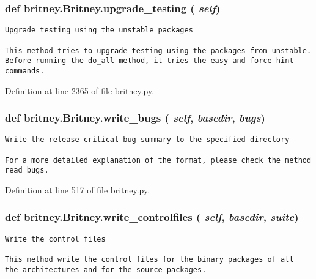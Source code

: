 \subsubsection{\setlength{\rightskip}{0pt plus 5cm}def britney.Britney.upgrade\_\-testing ( {\em self})}\label{classbritney_1_1Britney_921effe0d64ed713c38888684a0a26d4}




\footnotesize\begin{verbatim}Upgrade testing using the unstable packages

This method tries to upgrade testing using the packages from unstable.
Before running the do_all method, it tries the easy and force-hint
commands.
\end{verbatim}
\normalsize
 

Definition at line 2365 of file britney.py.
\subsubsection{\setlength{\rightskip}{0pt plus 5cm}def britney.Britney.write\_\-bugs ( {\em self},  {\em basedir},  {\em bugs})}\label{classbritney_1_1Britney_0a5591fc94b89d53d12cbb8f27d100a7}




\footnotesize\begin{verbatim}Write the release critical bug summary to the specified directory

For a more detailed explanation of the format, please check the method
read_bugs.
\end{verbatim}
\normalsize
 

Definition at line 517 of file britney.py.
\subsubsection{\setlength{\rightskip}{0pt plus 5cm}def britney.Britney.write\_\-controlfiles ( {\em self},  {\em basedir},  {\em suite})}\label{classbritney_1_1Britney_1a3695a37b15ebd7e81cc33683fde461}




\footnotesize\begin{verbatim}Write the control files

This method write the control files for the binary packages of all
the architectures and for the source packages.
\end{verbatim}
\normalsize
 

